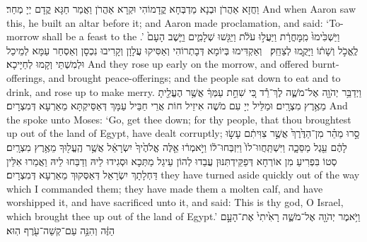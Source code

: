 {וַחֲזָא אַהֲרֹן וּבְנָא מַדְבְּחָא קֳדָמוֹהִי וּקְרָא אַהֲרֹן וַאֲמַר חַגָּא קֳדָם יְיָ מְחַר׃}
{And when Aaron saw this, he built an altar before it; and Aaron made proclamation, and said: ‘To-morrow shall be a feast to the \lord.’}{}
{וַיַּשְׁכִּ֙ימוּ֙ מִֽמׇּחֳרָ֔ת וַיַּעֲל֣וּ עֹלֹ֔ת וַיַּגִּ֖שׁוּ שְׁלָמִ֑ים וַיֵּ֤שֶׁב הָעָם֙ לֶֽאֱכֹ֣ל וְשָׁת֔וֹ וַיָּקֻ֖מוּ לְצַחֵֽק׃ \petucha 
{}}
{וְאַקְדִּימוּ בְּיוֹמָא דְּבָתְרוֹהִי וְאַסִּיקוּ עֲלָוָן וְקָרִיבוּ נִכְסָן וְאַסְחַר עַמָּא לְמֵיכַל וּלְמִשְׁתֵּי וְקָמוּ לְחַיָּיכָא׃}
{And they rose up early on the morrow, and offered burnt-offerings, and brought peace-offerings; and the people sat down to eat and to drink, and rose up to make merry.}{}
{וַיְדַבֵּ֥ר יְהֹוָ֖ה אֶל־מֹשֶׁ֑ה לֶךְ־רֵ֕ד כִּ֚י שִׁחֵ֣ת עַמְּךָ֔ אֲשֶׁ֥ר הֶעֱלֵ֖יתָ מֵאֶ֥רֶץ מִצְרָֽיִם׃
}
{וּמַלֵּיל יְיָ עִם מֹשֶׁה אִיזֵיל חוֹת אֲרֵי חַבֵּיל עַמָּךְ דְּאַסֵּיקְתָּא מֵאַרְעָא דְּמִצְרָיִם׃}
{And the \lord\space spoke unto Moses: ‘Go, get thee down; for thy people, that thou broughtest up out of the land of Egypt, have dealt corruptly;}{}
{סָ֣רוּ מַהֵ֗ר מִן־הַדֶּ֙רֶךְ֙ אֲשֶׁ֣ר צִוִּיתִ֔ם עָשׂ֣וּ לָהֶ֔ם עֵ֖גֶל מַסֵּכָ֑ה וַיִּשְׁתַּֽחֲווּ־לוֹ֙ וַיִּזְבְּחוּ־ל֔וֹ וַיֹּ֣אמְר֔וּ אֵ֤לֶּה אֱלֹהֶ֙יךָ֙ יִשְׂרָאֵ֔ל אֲשֶׁ֥ר הֶֽעֱל֖וּךָ מֵאֶ֥רֶץ מִצְרָֽיִם׃}
{סְטוֹ בִּפְרִיעַ מִן אוֹרְחָא דְּפַקֵּידְתִּנּוּן עֲבַדוּ לְהוֹן עֵיגַל מַתְּכָא וּסְגִידוּ לֵיהּ וְדַבַּחוּ לֵיהּ וַאֲמַרוּ אִלֵּין דַּחְלָתָךְ יִשְׂרָאֵל דְּאַסְּקוּךְ מֵאַרְעָא דְּמִצְרָיִם׃}
{they have turned aside quickly out of the way which I commanded them; they have made them a molten calf, and have worshipped it, and have sacrificed unto it, and said: This is thy god, O Israel, which brought thee up out of the land of Egypt.’}{}
{וַיֹּ֥אמֶר יְהֹוָ֖ה אֶל־מֹשֶׁ֑ה רָאִ֙יתִי֙ אֶת־הָעָ֣ם הַזֶּ֔ה וְהִנֵּ֥ה עַם־קְשֵׁה־עֹ֖רֶף הֽוּא׃
}
